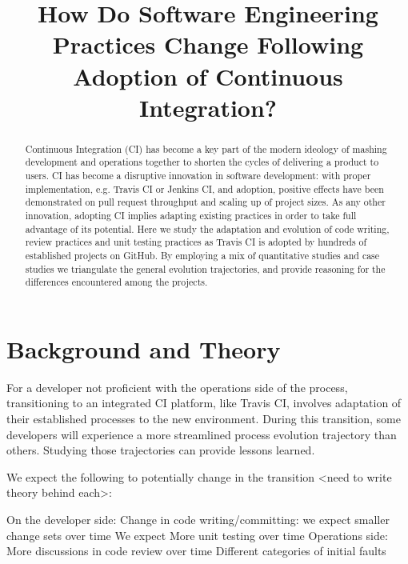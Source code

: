 \documentclass[conference]{IEEEtran}
\begin{document}
\title{How Do Software Engineering Practices
Change Following Adoption of Continuous Integration?}

\author
{
\and
{}
\and
{}
\and
{}
\and
{}
}
\maketitle
\begin{abstract}
Continuous Integration (CI) has become a key part of the modern ideology of mashing development and operations together to shorten the cycles of delivering a product to users. CI has become a disruptive innovation in software development: with proper implementation, e.g. Travis CI or Jenkins CI, and adoption, positive effects have been demonstrated on pull request throughput and scaling up of project sizes. As any other innovation, adopting CI implies adapting existing practices in order to take full advantage of its potential. Here we study the adaptation and evolution of code writing, review practices and unit testing practices as Travis CI is adopted by hundreds of established projects on GitHub. By employing a mix of quantitative studies and case studies we triangulate the general evolution trajectories, and provide reasoning for the differences encountered among the projects.
\end{abstract}




\section{Background and Theory}

For a developer not proficient with the operations side of the process, transitioning to an integrated CI platform, like Travis CI, involves adaptation of their established processes to the new environment. During this transition, some developers will experience a more streamlined process evolution trajectory than others. Studying those trajectories can provide lessons learned.


We expect the following to potentially change in the transition <need to write theory behind each>:

On the developer side:
Change in code writing/committing: we expect smaller change sets over time
We expect More unit testing over time
Operations side:
More discussions in code review over time
Different categories of initial faults
\end{document}

